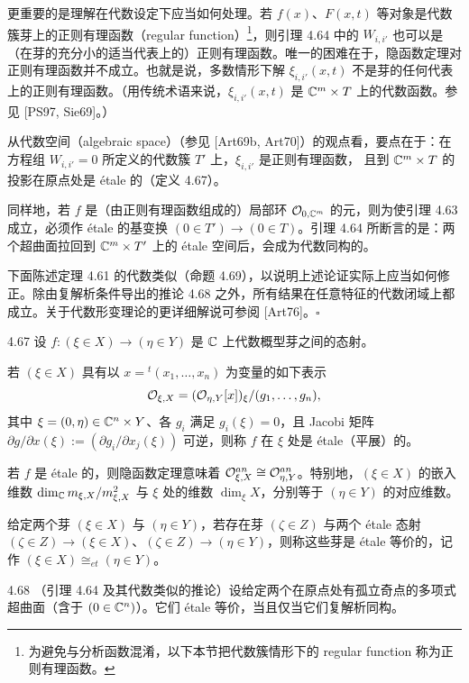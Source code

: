 更重要的是理解在代数设定下应当如何处理。若 $f(x)$、$F(x,t)$ 等对象是代数簇芽上的正则有理函数（regular function）\footnote{为避免与分析函数混淆，以下本节把代数簇情形下的 regular function 称为正则有理函数。}，则引理 4.64 中的 $W_{i,i'}$ 也可以是（在芽的充分小的适当代表上的）正则有理函数。唯一的困难在于，隐函数定理对正则有理函数并不成立。也就是说，多数情形下解 $\xi_{i,i'}(x,t)$ 不是芽的任何代表上的正则有理函数。（用传统术语来说，$\xi_{i,i'}(x,t)$ 是 $\mathbb{C}^m\times T$ 上的代数函数。参见 [PS97, Sie69]。）

从代数空间（algebraic space）（参见 [Art69b, Art70]）的观点看，要点在于：在方程组 $W_{i,i'}=0$ 所定义的代数簇 $T'$ 上，$\xi_{i,i'}$ 是正则有理函数，
且到 $\mathbb{C}^m\times T$ 的投影在原点处是 étale 的（定义 4.67）。

同样地，若 $f$ 是（由正则有理函数组成的）局部环 $\mathcal{O}_{0,\mathbb{C}^m}$ 的元，则为使引理 4.63 成立，必须作 étale 的基变换 $(0\in T')\to(0\in T)$。引理 4.64 所断言的是：两个超曲面拉回到 $\mathbb{C}^m\times T'$ 上的 étale 空间后，会成为代数同构的。

下面陈述定理 4.61 的代数类似（命题 4.69），以说明上述论证实际上应当如何修正。除由复解析条件导出的推论 4.68 之外，所有结果在任意特征的代数闭域上都成立。关于代数形变理论的更详细解说可参阅 [Art76]。\hfill$\square$

\begin{definition}{4.67}
设 $f:(\xi\in X)\to(\eta\in Y)$ 是 $\mathbb{C}$ 上代数概型芽之间的态射。

若 $(\xi\in X)$ 具有以 $x={}^t(x_1,\dots,x_n)$ 为变量的如下表示
\[ \mathcal{O}_{\xi,X}=(\mathcal{O}_{\eta,Y}[x])_{\xi}/(g_1,\dots,g_n), \]
其中 $\xi=(0,\eta)\in\mathbb{C}^n\times Y$、各 $g_i$ 满足 $g_i(\xi)=0$，且 Jacobi 矩阵 $\partial g/\partial x(\xi):=(\partial g_i/\partial x_j(\xi))$ 可逆，则称 $f$ 在 $\xi$ 处是 étale（平展）的。

若 $f$ 是 étale 的，则隐函数定理意味着 $\mathcal{O}_{\xi,X}^{an}\cong\mathcal{O}_{\eta,Y}^{an}$。特别地，$(\xi\in X)$ 的嵌入维数 $\dim_{\mathbb{C}}m_{\xi,X}/m_{\xi,X}^2$ 与 $\xi$ 处的维数 $\dim_{\xi}X$，分别等于 $(\eta\in Y)$ 的对应维数。

给定两个芽 $(\xi\in X)$ 与 $(\eta\in Y)$，若存在芽 $(\zeta\in Z)$ 与两个 étale 态射 $(\zeta\in Z)\to(\xi\in X)$、$(\zeta\in Z)\to(\eta\in Y)$，则称这些芽是 étale 等价的，记作 $(\xi\in X)\cong_{et}(\eta\in Y)$。
\end{definition}

\begin{corollary}{4.68}
（引理 4.64 及其代数类似的推论）设给定两个在原点处有孤立奇点的多项式超曲面（含于 $(0\in\mathbb{C}^n)$）。它们 étale 等价，当且仅当它们复解析同构。
\end{corollary}

